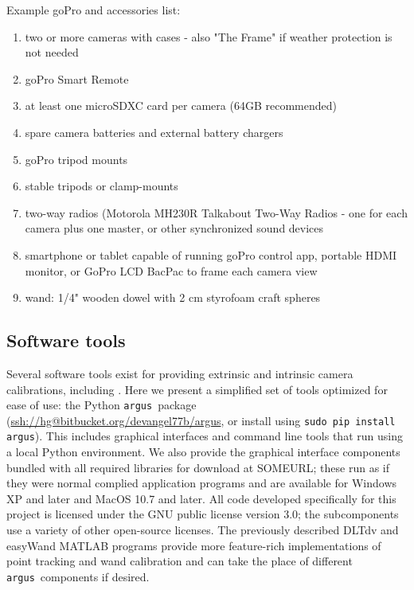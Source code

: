 \documentclass[fleqn,10pt]{wlpeerj}
\makeatletter
\newcommand{\argus}{\texttt{argus}}
\newcommand{\pipcommand}{\texttt{sudo pip install argus}}
\newcommand{\argusrepo}{\url{ssh://hg@bitbucket.org/devangel77b/argus}}
\makeatother
\begin{document}
Example goPro and accessories list:
\begin{enumerate}
\item{two or more cameras with cases - also "The Frame" if weather protection is not needed}
\item{goPro Smart Remote}
\item{at least one microSDXC card per camera (64GB recommended)}
\item{spare camera batteries and external battery chargers}
\item{goPro tripod mounts}
\item{stable tripods or clamp-mounts}
\item{two-way radios (Motorola MH230R Talkabout Two-Way Radios - one for each camera plus one master, or other synchronized sound devices}
\item{smartphone or tablet capable of running goPro control app, portable HDMI monitor, or GoPro LCD BacPac to frame each camera view}
\item{wand: 1/4" wooden dowel with 2 cm styrofoam craft spheres}
\end{enumerate}

\subsection*{Software tools}
Several software tools exist for providing extrinsic and intrinsic camera calibrations, including \citep{bouguet2004camera,Hedrick2008,lour09,Theriault:2014}.  Here we present a simplified set of tools optimized for ease of use: the Python \argus\ package (\argusrepo, or install using \pipcommand). This includes graphical interfaces and command line tools that run using a local Python environment. We also provide the graphical interface components bundled with all required libraries for download at SOMEURL; these run as if they were normal complied application programs and are available for Windows XP and later and MacOS 10.7 and later. All code developed specifically for this project is licensed under the GNU public license version 3.0; the subcomponents use a variety of other open-source licenses. The previously described DLTdv \citep{Hedrick2008} and easyWand \citep{Theriault:2014} MATLAB programs provide more feature-rich implementations of point tracking and wand calibration and can take the place of different \argus\ components if desired.
\end{document}

